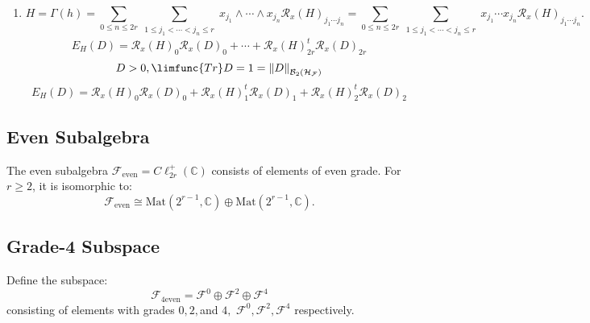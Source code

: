 \documentclass[aps,preprint]{revtex4}
\begin{document}
\begin{enumerate}
\item 
\begin{equation}
H=\Gamma \left( h\right) =\sum_{0\leq n\leq 2r}\sum_{\substack{ 1\leq
j_{1}<\cdots <j_{n}\leq r}}x_{j_{1}}\wedge \cdots \wedge x_{j_{n}}\mathcal{R}%
_{x}\left( H\right) _{j_{1}\cdots j_{n}}=\sum_{0\leq n\leq 2r}\sum 
_{\substack{ 1\leq j_{1}<\cdots <j_{n}\leq r}}x_{j_{1}}\cdots x_{j_{n}}%
\mathcal{R}_{x}\left( H\right) _{j_{1}\cdots j_{n}}.
\end{equation}%
\begin{equation}
E_{H}\left( D\right) =\mathcal{R}_{x}\left( H\right) _{0}\mathcal{R}%
_{x}\left( D\right) _{0}+\mathcal{\cdots }+\mathcal{R}_{x}\left( H\right)
_{2r}^{t}\mathcal{R}_{x}\left( D\right) _{2r}
\end{equation}%
\begin{equation}
D>0,\limfunc{Tr}D=1=\left\Vert D\right\Vert _{\mathcal{B}_{2}\left( \mathcal{%
H}_{\mathcal{F}}\right) }
\end{equation}%
\begin{equation}
E_{H}\left( D\right) =\mathcal{R}_{x}\left( H\right) _{0}\mathcal{R}%
_{x}\left( D\right) _{0}+\mathcal{R}_{x}\left( H\right) _{1}^{t}\mathcal{R}%
_{x}\left( D\right) _{1}+\mathcal{R}_{x}\left( H\right) _{2}^{t}\mathcal{R}%
_{x}\left( D\right) _{2}
\end{equation}
\end{enumerate}

\subsection{Even Subalgebra}

The even subalgebra $\mathcal{F}_{\text{even}}=C\ell _{2r}^{+}(\mathbb{C})$
consists of elements of even grade. For $r\geq 2$, it is isomorphic to: 
\begin{equation}
\mathcal{F}_{\text{even}}\cong \mathrm{Mat}(2^{r-1},\mathbb{C})\oplus 
\mathrm{Mat}(2^{r-1},\mathbb{C}).
\end{equation}

\subsection{Grade-4 Subspace}

Define the subspace: 
\begin{equation}
\mathcal{F}_{4\text{even}}=\mathcal{F}^{0}\oplus \mathcal{F}^{2}\oplus 
\mathcal{F}^{4}
\end{equation}%
consisting of elements with grades $0,2,$and $4,$ $\mathcal{F}^{0},\mathcal{F%
}^{2},\mathcal{F}^{4}$ respectively.
\end{document}
